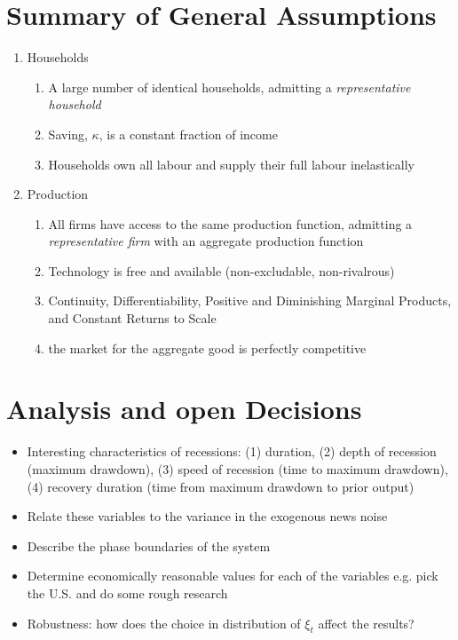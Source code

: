\documentclass[11pt]{article}
\begin{document}
\section{Summary of General Assumptions}
\begin{enumerate}
\item Households
	\begin{enumerate}
	\item A large number of identical households, admitting a \textit{representative household}
	\item Saving, $\kappa$, is a constant fraction of income
	\item Households own all labour and supply their full labour inelastically
	\end{enumerate}
\item Production
	\begin{enumerate}
	\item All firms have access to the same production function, admitting a \textit{representative firm} with an aggregate production function
	\item Technology is free and available (non-excludable, non-rivalrous)
	\item Continuity, Differentiability, Positive and Diminishing Marginal Products, and Constant Returns to Scale
	\item the market for the aggregate good is perfectly competitive
	\end{enumerate}
\end{enumerate}

\section{Analysis and open Decisions}
\begin{itemize}
\item Interesting characteristics of recessions: (1) duration, (2) depth of recession (maximum drawdown), (3) speed of recession (time to maximum drawdown), (4) recovery duration (time from maximum drawdown to prior output)
\item Relate these variables to the variance in the exogenous news noise
\item Describe the phase boundaries of the system
\item Determine economically reasonable values for each of the variables e.g. pick the U.S. and do some rough research
\item Robustness: how does the choice in distribution of $\xi_t$ affect the results?
\end{itemize}
\end{document}
